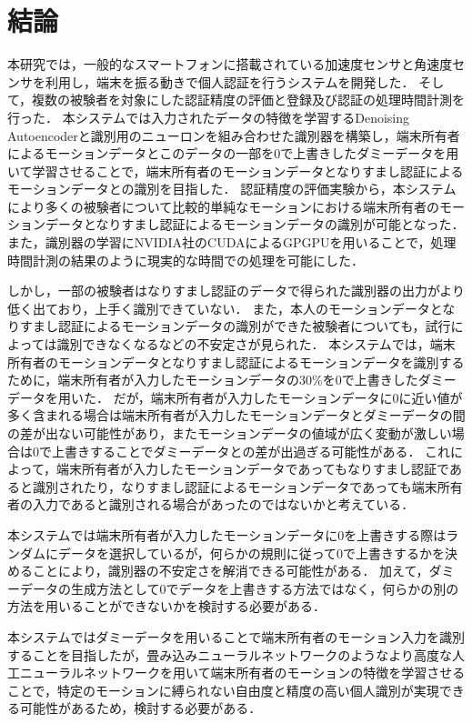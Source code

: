 \chapter{結論}
本研究では，一般的なスマートフォンに搭載されている加速度センサと角速度センサを利用し，端末を振る動きで個人認証を行うシステムを開発した．
そして，複数の被験者を対象にした認証精度の評価と登録及び認証の処理時間計測を行った．
本システムでは入力されたデータの特徴を学習するDenoising Autoencoderと識別用のニューロンを組み合わせた識別器を構築し，端末所有者によるモーションデータとこのデータの一部を0で上書きしたダミーデータを用いて学習させることで，端末所有者のモーションデータとなりすまし認証によるモーションデータとの識別を目指した．
認証精度の評価実験から，本システムにより多くの被験者について比較的単純なモーションにおける端末所有者のモーションデータとなりすまし認証によるモーションデータの識別が可能となった．
また，識別器の学習にNVIDIA社のCUDAによるGPGPUを用いることで，処理時間計測の結果のように現実的な時間での処理を可能にした．

しかし，一部の被験者はなりすまし認証のデータで得られた識別器の出力がより低く出ており，上手く識別できていない．
また，本人のモーションデータとなりすまし認証によるモーションデータの識別ができた被験者についても，試行によっては識別できなくなるなどの不安定さが見られた．
本システムでは，端末所有者のモーションデータとなりすまし認証によるモーションデータを識別するために，端末所有者が入力したモーションデータの30\%を0で上書きしたダミーデータを用いた．
だが，端末所有者が入力したモーションデータに0に近い値が多く含まれる場合は端末所有者が入力したモーションデータとダミーデータの間の差が出ない可能性があり，またモーションデータの値域が広く変動が激しい場合は0で上書きすることでダミーデータとの差が出過ぎる可能性がある．
これによって，端末所有者が入力したモーションデータであってもなりすまし認証であると識別されたり，なりすまし認証によるモーションデータであっても端末所有者の入力であると識別される場合があったのではないかと考えている．

本システムでは端末所有者が入力したモーションデータに0を上書きする際はランダムにデータを選択しているが，何らかの規則に従って0で上書きするかを決めることにより，識別器の不安定さを解消できる可能性がある．
加えて，ダミーデータの生成方法として0でデータを上書きする方法ではなく，何らかの別の方法を用いることができないかを検討する必要がある．

本システムではダミーデータを用いることで端末所有者のモーション入力を識別することを目指したが，畳み込みニューラルネットワークのようなより高度な人工ニューラルネットワークを用いて端末所有者のモーションの特徴を学習させることで，特定のモーションに縛られない自由度と精度の高い個人識別が実現できる可能性があるため，検討する必要がある．
